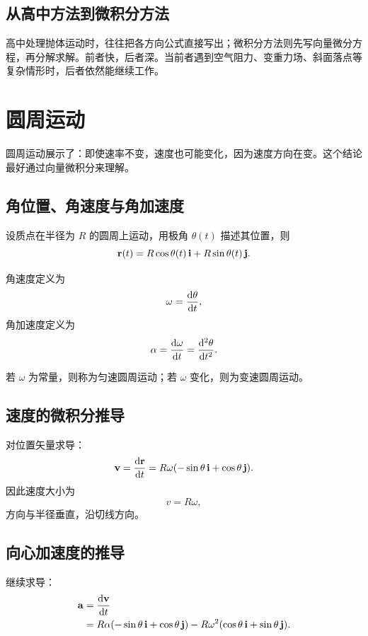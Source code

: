 \subsection{从高中方法到微积分方法}

高中处理抛体运动时，往往把各方向公式直接写出；微积分方法则先写向量微分方程，再分解求解。前者快，后者深。当前者遇到空气阻力、变重力场、斜面落点等复杂情形时，后者依然能继续工作。

\section{圆周运动}

圆周运动展示了：即使速率不变，速度也可能变化，因为速度方向在变。这个结论最好通过向量微积分来理解。

\subsection{角位置、角速度与角加速度}

设质点在半径为 $R$ 的圆周上运动，用极角 $\theta(t)$ 描述其位置，则
\[
\vb{r}(t)=R\cos\theta(t)\,\vb{i}+R\sin\theta(t)\,\vb{j}.
\]

\begin{definition}[角速度与角加速度]
角速度定义为
\[
 \omega=\dv{\theta}{t},
\]
角加速度定义为
\[
 \alpha=\dv{\omega}{t}=\dv[2]{\theta}{t}.
\]
\end{definition}

若 $\omega$ 为常量，则称为匀速圆周运动；若 $\omega$ 变化，则为变速圆周运动。

\subsection{速度的微积分推导}

对位置矢量求导：
\[
\vb{v}=\dv{\vb{r}}{t}
=R\omega\qty(-\sin\theta\,\vb{i}+\cos\theta\,\vb{j}).
\]
因此速度大小为
\[
 v=R\omega,
\]
方向与半径垂直，沿切线方向。

\subsection{向心加速度的推导}

继续求导：
\begin{align*}
\vb{a}
&=\dv{\vb{v}}{t}\\
&=R\alpha\qty(-\sin\theta\,\vb{i}+\cos\theta\,\vb{j})
 -R\omega^2\qty(\cos\theta\,\vb{i}+\sin\theta\,\vb{j}).
\end{align*}

